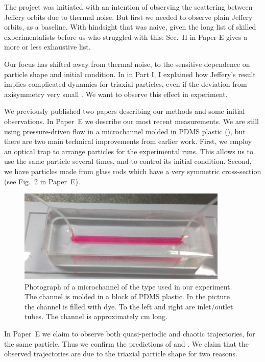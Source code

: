 \documentclass[thesis.tex]{subfiles}
\begin{document}
The project was initiated with an intention of observing the scattering between Jeffery orbits due to thermal noise. But first we needed to observe plain Jeffery orbits, as a baseline. With hindsight that was naive, given the long list of skilled experimentalists before us who struggled with this: Sec.~II in Paper E gives a more or less exhaustive list. 

Our focus has shifted away from thermal noise, to the sensitive dependence on particle shape and initial condition. In  in Part I, I explained how Jeffery's result implies complicated dynamics for triaxial particles, even if the deviation from axisymmetry very small \cite{hinch1979,yarin1997}. We want to observe this effect in experiment.

We previously published two papers \cite{mishra2012,einarsson2013} describing our methods and some initial observations. In Paper~E we describe our most recent measurements. We are still using pressure-driven flow in a microchannel molded in PDMS plastic (), but there are two main technical improvements from earlier work. First, we employ an optical trap to arrange particles for the experimental runs. This allows us to use the same particle several times, and to control its initial condition. Second, we have particles made from glass rods which have a very symmetric cross-section (see Fig.~2 in Paper~E).

\begin{figure}
\centering
\includegraphics[width=10cm]{figs/expsetup_hires.png}%
\caption{\label{fig:exp_setup} Photograph of a microchannel of the type used in our experiment. The channel is molded in a block of PDMS plastic. In the picture the channel is filled with dye. To the left and right are inlet/outlet tubes. The channel is approximately \unit[5]{cm} long.}%
\end{figure}

In Paper~E we claim to observe both quasi-periodic and chaotic trajectories, for the same particle. Thus we confirm the predictions of \citet{hinch1979} and \citet{yarin1997}. We claim that the observed trajectories are due to the triaxial particle shape for two reasons. 
\end{document}
